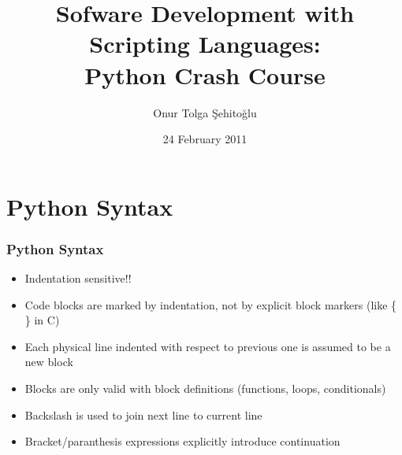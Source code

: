 \documentclass[trans,compress,xcolor=table]{beamer}
\title{Sofware Development with Scripting Languages:\\Python Crash Course}
\author{Onur Tolga Şehitoğlu}
\institute{Computer Engineering,METU}
\date{24 February 2011}
\begin{document}

%


 \frame{\maketitle}
 \frame{\tableofcontents}

\section{Python Syntax}
\begin{frame}
\frametitle{Python Syntax}
\begin{itemize}
\item \alert{Indentation sensitive!!}
\item Code blocks are marked by indentation, not by explicit block markers (like \{ \} in C)
\item Each physical line indented with respect to previous one is assumed to be a new block
\item Blocks are only valid with block definitions (functions, loops, conditionals)
\item Backslash is used to join next line to current line 
\item Bracket/paranthesis expressions explicitly introduce continuation
\end{itemize}
\end{frame}
\end{document}
